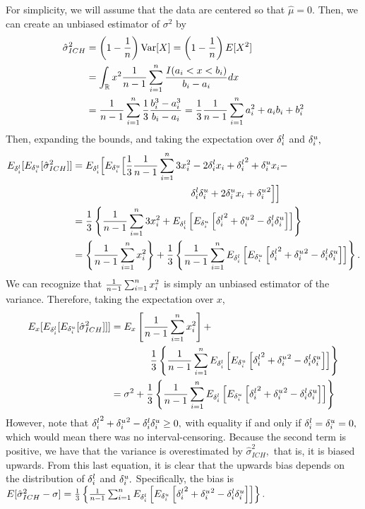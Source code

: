 For simplicity, we will assume that the data are centered so that $\hat\mu = 0.$ Then, we can create an unbiased estimator of $\sigma^2$ by
\begin{align}
\hat{\sigma}^2_{ICH} &= \left(1 - \frac{1}{n} \right) \text{Var}[X] = \left(1 - \frac{1}{n} \right) E[X^2] \\
&= \int_{\mathbb{R}} x^2 \frac{1}{n - 1}\sum_{i=1}^n \frac{I(a_i < x < b_i)}{b_i - a_i} dx \\
&= \frac{1}{n - 1}\sum_{i=1}^n \frac{1}{3} \frac{b_i^3 - a_i^3}{b_i - a_i}
= \frac{1}{3} \frac{1}{n - 1}\sum_{i=1}^n a_i^2 + a_i b_i + b_i^2
\end{align}
Then, expanding the bounds, and taking the expectation over ${\delta^l_i}$ and ${\delta^u_i},$
\begin{align}
E_{\delta^l_i} [E_{\delta^u_i} [\hat{\sigma}^2_{ICH}]] &=  E_{\delta^l_i} \Big[ E_{\delta^u_i} \Big[ \frac{1}{3} \frac{1}{n - 1}\sum_{i=1}^n 3 x_i^2 - 2{\delta^l_i} x_i + {\delta^l_i}^2 + {\delta^u_i} x_i - \\ &
\qquad \qquad \qquad \qquad \qquad \qquad {\delta^l_i} {\delta^u_i} + 2 {\delta^u_i} x_i + {\delta^u_i}^2 \Big]  \Big] \\
 &= \frac{1}{3} \left\{ \frac{1}{n - 1}\sum_{i=1}^n 3 x_i^2 +  E_{\delta^l_i} \left[ E_{\delta^u_i} \left[ {\delta^l_i}^2 + {\delta^u_i}^2 - {\delta^l_i} {\delta^u_i} \right] \right]  \right\} \\
 &= \left\{ \frac{1}{n - 1}\sum_{i=1}^n x_i^2  \right\}   + \frac{1}{3} \left\{ \frac{1}{n - 1}\sum_{i=1}^n E_{\delta^l_i} \left[ E_{\delta^u_i} \left[ {\delta^l_i}^2 + {\delta^u_i}^2 - {\delta^l_i}{\delta^u_i} \right] \right] \right\}.
\end{align}
We can recognize that $\frac{1}{n - 1}\sum_{i=1}^n{x_i^2}$ is simply an unbiased estimator of the variance. Therefore, taking the expectation over $x$,
\begin{align}
E_x[E_{\delta^l_i} [E_{\delta^u_i} [\hat{\sigma}^2_{ICH}]]] &= E_x \left[ \frac{1}{n - 1}\sum_{i=1}^n x_i^2 \right] +  \\ & \qquad \qquad  \frac{1}{3}\left\{ \frac{1}{n - 1}\sum_{i=1}^n E_{\delta^l_i} \left[ E_{\delta^u_i} \left[ {\delta^l_i}^2 + {\delta^u_i}^2 - {\delta^l_i}{\delta^u_i} \right]\right] \right\} \\
&= \sigma^2 +  \frac{1}{3}\left\{ \frac{1}{n - 1}\sum_{i=1}^n E_{\delta^l_i} \left[ E_{\delta^u_i} \left[ {\delta^l_i}^2 + {\delta^u_i}^2 - {\delta^l_i}{\delta^u_i} \right] \right] \right\}
\end{align}
However, note that  ${\delta^l_i}^2 + {\delta^u_i}^2 - {\delta^l_i}{\delta^u_i} \geq 0,$ with equality if and only if ${\delta^l_i} = {\delta^u_i} = 0,$ which would mean there was no interval-censoring. Because the second term is positive, we have that the variance is overestimated by $\hat{\sigma}^2_{ICH},$ that is, it is biased upwards. From this last equation, it is clear that the upwards bias depends on the distribution of ${\delta^l_i}$ and ${\delta^u_i}.$ Specifically, the bias is $E[\hat{\sigma}^2_{ICH} - \sigma] =   \frac{1}{3}\left\{ \frac{1}{n - 1}\sum_{i=1}^n E_{\delta^l_i} \left[ E_{\delta^u_i} \left[ {\delta^l_i}^2 + {\delta^u_i}^2 - {\delta^l_i}{\delta^u_i} \right]\right] \right\}.$


